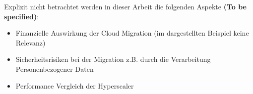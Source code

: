 Explizit nicht betrachtet werden in dieser Arbeit die folgenden Aspekte \textbf{(To be specified)}:
\begin{itemize}
\item Finanzielle Auswirkung der Cloud Migration (im dargestellten Beispiel keine Relevanz)
\item Sicherheitsrisiken bei der Migration z.B. durch die Verarbeitung Personenbezogener Daten
\item Performance Vergleich der Hyperscaler
\end{itemize}

\pagebreak



